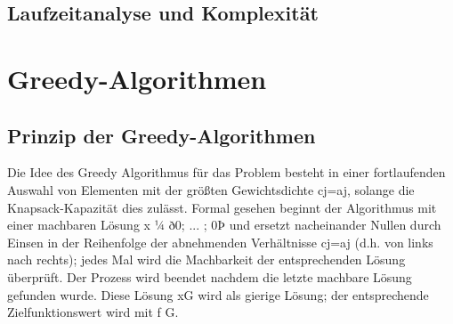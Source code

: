 \documentclass[12pt]{report}
\begin{document}
\section{Laufzeitanalyse und Komplexität}

\chapter{Greedy-Algorithmen}



\section{Prinzip der Greedy-Algorithmen}
Die Idee des Greedy Algorithmus für das Problem besteht in einer fortlaufenden Auswahl von Elementen mit der größten Gewichtsdichte cj=aj, solange die
Knapsack-Kapazität dies zulässt. Formal gesehen beginnt der Algorithmus mit einer machbaren Lösung x ¼ ð0; ... ; 0Þ und ersetzt nacheinander Nullen durch Einsen in der
Reihenfolge der abnehmenden Verhältnisse cj=aj (d.h. von links nach rechts);  jedes Mal wird die Machbarkeit der entsprechenden Lösung überprüft. Der Prozess wird beendet
nachdem die letzte machbare Lösung gefunden wurde. Diese Lösung xG wird als gierige
Lösung; der entsprechende Zielfunktionswert wird mit f G. \cite{diubin2003average}

\end{document}
